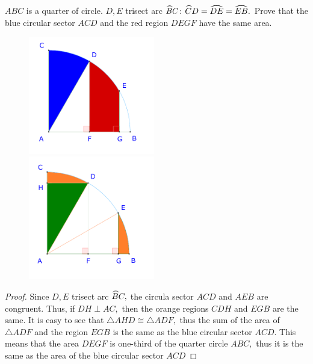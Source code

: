 \documentclass{article}
\begin{document}
\begin{example*}[Example 15]
    $ABC$ is a quarter of circle. $D, E$ trisect arc $\arc BC$: $\arc CD = \arc {DE} = \arc {EB}.$
    Prove that the blue circular sector $ACD$ and the red region $DEGF$ have the same area.
\end{example*}

\begin{figure}[h]
    \centering
    \begin{minipage}[t]{6.5cm}
        \begin{center}
            \includegraphics[width=5.5cm]{./svg/pdf/23-24-s3-i-p16.pdf}
        \end{center}
    \end{minipage}
    \qquad
    \begin{minipage}[t]{6.5cm}
        \centering
        \begin{center}
            \includegraphics[width=5.5cm]{./svg/pdf/23-24-s3-i-p16-s.pdf}
        \end{center}
    \end{minipage}
\end{figure}

\begin{proof}
    Since $D, E$ trisect arc $\arc BC,$ the circula sector $ACD$ and $AEB$ are congruent.
    Thus, if $DH \perp AC,$ then the orange regions $CDH$ and $EGB$ are the same.
    It is easy to see that $\triangle AHD \cong \triangle ADF,$
    thus the sum of the area of $\triangle ADF$ and the region $EGB$ is the same as the blue circular sector $ACD$.
    This means that the area $DEGF$ is one-third of the quarter circle $ABC,$ thus it is the same as the area of the blue circular sector $ACD$
\end{proof}
\end{document}
